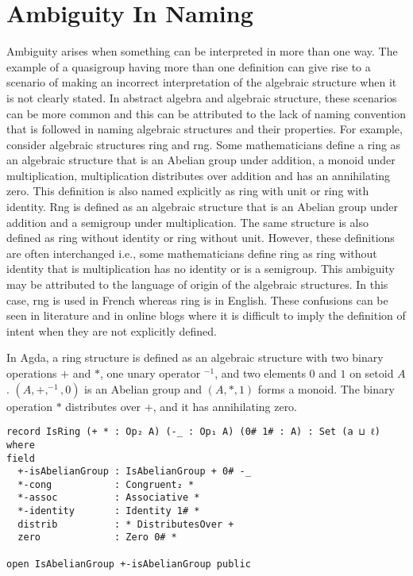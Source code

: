 \section{Ambiguity In Naming}
Ambiguity arises when something can be interpreted in more than one way. The
example of a quasigroup having more than one definition can give rise to a
scenario of making an incorrect interpretation of the algebraic structure when
it is not clearly stated. In abstract algebra and algebraic structure, these
scenarios can be more common and this can be attributed to the lack of naming
convention that is followed in naming algebraic structures and their properties.
For example, consider algebraic structures ring and rng. Some mathematicians
define a ring as an algebraic structure that is an Abelian group under addition,
a monoid under multiplication, multiplication distributes over addition and has
an annihilating zero. This definition is also named explicitly as ring with unit
or ring with identity. Rng is defined as an algebraic structure that is an
Abelian group under addition and a semigroup under multiplication. The same
structure is also defined as ring without identity or ring without unit.
However, these definitions are often interchanged i.e., some mathematicians
define ring as ring without identity that is multiplication has no identity or
is a semigroup. This ambiguity may be attributed to the language of origin of
the algebraic structures. In this case, rng is used in French whereas ring is in
English. These confusions can be seen in literature and in online blogs where it
is difficult to imply the definition of intent when they are not explicitly
defined. 

In Agda, a ring structure is defined as an algebraic structure with two binary
operations $+$ and $*$, one unary operator $^{-1}$, and two elements $0$ and $1$
on setoid $A$. $(A,+,^{-1},0)$ is an Abelian group and $(A,*,1)$ forms a monoid.
The binary operation $*$ distributes over $+$, and it has annihilating zero.

\begin{verbatim}
record IsRing (+ * : Op₂ A) (-_ : Op₁ A) (0# 1# : A) : Set (a ⊔ ℓ) where
field
  +-isAbelianGroup : IsAbelianGroup + 0# -_
  *-cong           : Congruent₂ *
  *-assoc          : Associative *
  *-identity       : Identity 1# *
  distrib          : * DistributesOver +
  zero             : Zero 0# *

open IsAbelianGroup +-isAbelianGroup public
\end{verbatim} 

